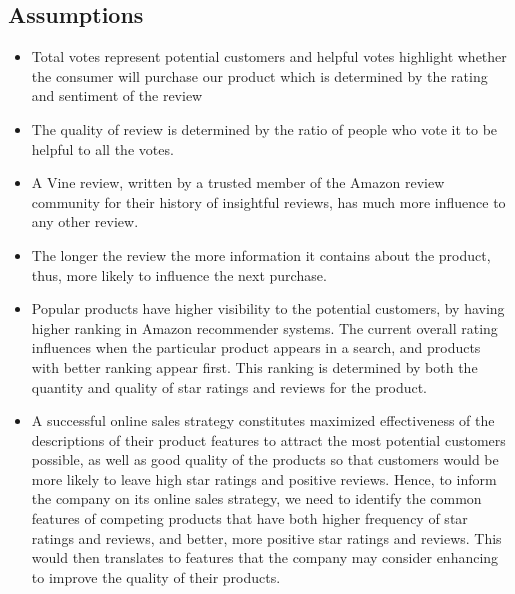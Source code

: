 \documentclass[reqno]{article}
\theoremstyle{definition}
\theoremstyle{definition}
\theoremstyle{remark}
\begin{document}
\subsection{Assumptions}
\begin{itemize}
    \item Total votes represent potential customers and helpful votes highlight whether the consumer will purchase our product which is determined by the rating and sentiment of the review
    \item The quality of review is determined by the ratio of people who vote it to be helpful to all the votes.
    \item A Vine review, written by a trusted member of the Amazon review community for their history of insightful reviews, has much more influence to any other review.
    \item The longer the review the more information it contains about the product, thus, more likely to influence the next purchase.
    \item Popular products have higher visibility to the potential customers, by having higher ranking in Amazon recommender systems. The current overall rating influences when the particular product appears in a search, and products with better ranking appear first. This ranking is determined by both the quantity and quality of star ratings and reviews for the product.
    \item A successful online sales strategy constitutes maximized effectiveness of the descriptions of their product features to attract the most potential customers possible, as well as good quality of the products so that customers would be more likely to leave high star ratings and positive reviews. Hence, to inform the company on its online sales strategy, we need to identify the common features of competing products that have both higher frequency of star ratings and reviews, and better, more positive star ratings and reviews. This would then translates to features that the company may consider enhancing to improve the quality of their products.\\
\end{itemize}
\end{document}
